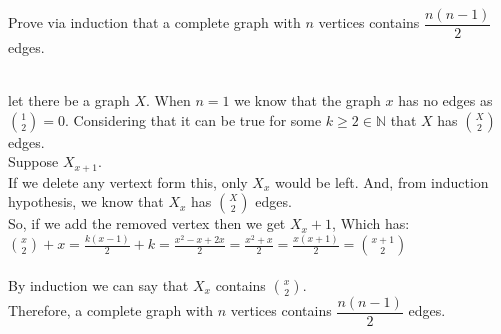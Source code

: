 \documentclass[addpoints]{exam}
\begin{document}
\begin{questions}
\question[5] Prove via induction that a complete graph with $n$ vertices contains $\dfrac{n(n-1)}{2}$ edges.
  \begin{solution}    
    \\let there be a graph $X$. 
    When $n=1$ we know that the graph $x$ has no edges as ${1\choose 2}=0$.
    Considering that it can be true for some $k\geq 2\in \mathbb{N}$ that $X$ has ${X\choose 2}$ edges. 
    \\Suppose $X_{x+1}$. 
    \\If we delete any vertext form this, only $X_{x}$ would be left.
    And, from induction hypothesis, we know that $X_x$ has $X \choose 2$ edges.
   \\ So, if we add the removed vertex then we get $X_x+1$, Which has:\\
    ${x\choose 2}+x=\frac{k(x-1)}{2}+k=\frac{x^2-x+2x}{2}=\frac{x^2+x}{2}=\frac{x(x+1)}{2}={x+1\choose 2}$ \\
    \\By induction we can say that $X_x$ contains $x \choose 2$. 
    \\Therefore, a complete graph with $n$ vertices contains $\dfrac{n(n-1)}{2}$ edges.
  \end{solution}
  
\end{questions}
\end{document}
